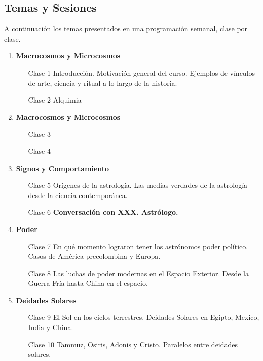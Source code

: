 \documentclass{report}
\begin{document}
\subsection*{Temas y Sesiones}

A continuaci\'on los temas presentados en una programaci\'on semanal,
clase por clase.

\begin{enumerate}
\item {\bf Macrocosmos y Microcosmos}
\begin{itemize}
\item[Clase 1] Introducci\'on. Motivaci\'on general del
  curso. Ejemplos de v\'inculos de arte, ciencia y ritual a lo
  largo de la historia.
\item[Clase 2] Alquimia
\end{itemize}

\item {\bf Macrocosmos y Microcosmos}
\begin{itemize}
\item[Clase 3]
\item[Clase 4]
\end{itemize}

\item {\bf Signos y Comportamiento}
\begin{itemize}
\item[Clase 5] Or\'igenes de la astrolog\'ia. Las medias verdades de
  la astrolog\'ia desde la ciencia contempor\'anea. 
\item[Clase 6] {\bf Conversaci\'on con XXX. Astr\'ologo.}
\end{itemize}

\item {\bf Poder}
\begin{itemize}
\item[Clase 7] En qu\'e momento lograron tener los astr\'onomos poder
  pol\'itico. Casos de Am\'erica precolombina y Europa.
\item[Clase 8] Las luchas de poder modernas en el Espacio
  Exterior. Desde la Guerra Fr\'ia hasta China en el espacio.
\end{itemize}

\item {\bf Deidades Solares}
\begin{itemize}
\item[Clase 9] El Sol en los ciclos terrestres. Deidades Solares en
  Egipto, Mexico, India y China.
\item[Clase 10] Tammuz, Osiris, Adonis y Cristo. Paralelos entre
  deidades solares.
\end{itemize}


\end{enumerate}
\end{document}
